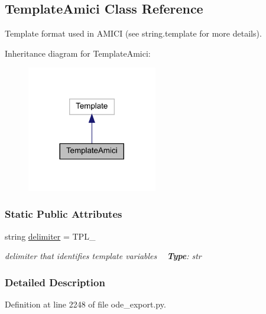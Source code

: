 \hypertarget{classamici_1_1ode__export_1_1_template_amici}{}\subsection{Template\+Amici Class Reference}
\label{classamici_1_1ode__export_1_1_template_amici}


Template format used in A\+M\+I\+CI (see string.\+template for more details).  




Inheritance diagram for Template\+Amici\+:
\nopagebreak
\begin{figure}[H]
\begin{center}
\leavevmode
\includegraphics[width=161pt]{classamici_1_1ode__export_1_1_template_amici__inherit__graph}
\end{center}
\end{figure}
\subsubsection*{Static Public Attributes}
\begin{DoxyCompactItemize}
\item 
\mbox{\label{classamici_1_1ode__export_1_1_template_amici_aacf4e58be14eef37272a71c004bc3f58}} 
string \mbox{\hyperlink{classamici_1_1ode__export_1_1_template_amici_aacf4e58be14eef37272a71c004bc3f58}{delimiter}} = \textquotesingle{}T\+P\+L\+\_\+\textquotesingle{}
\begin{DoxyCompactList}\small\item\em delimiter that identifies template variables ~\newline
{\bfseries Type}\+: str \end{DoxyCompactList}\end{DoxyCompactItemize}


\subsubsection{Detailed Description}


Definition at line 2248 of file ode\+\_\+export.\+py.

